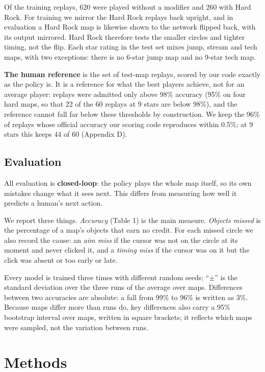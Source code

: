 \documentclass[10pt,a4paper]{article}
\begin{document}
Of the training replays, 620 were played without a modifier and 260 with Hard Rock. For training we mirror the Hard Rock replays back upright, and in evaluation a Hard Rock map is likewise shown to the network flipped back, with its output mirrored. Hard Rock therefore tests the smaller circles and tighter timing, not the flip. Each star rating in the test set mixes jump, stream and tech maps, with two exceptions: there is no 6-star jump map and no 9-star tech map.


\textbf{The human reference} is the set of test-map replays, scored by our code exactly as the policy is. It is a reference for what the best players achieve, not for an average player: replays were admitted only above 98\% accuracy (95\% on four hard maps, so that 22 of the 60 replays at 9 stars are below 98\%), and the reference cannot fall far below these thresholds by construction. We keep the 96\% of replays whose official accuracy our scoring code reproduces within 0.5\%; at 9 stars this keeps 44 of 60 (Appendix D).


\subsection{Evaluation}

All evaluation is \textbf{closed-loop}: the policy plays the whole map itself, so its own mistakes change what it sees next. This differs from measuring how well it predicts a human's next action.


We report three things. \textit{Accuracy} (Table 1) is the main measure. \textit{Objects missed} is the percentage of a map's objects that earn no credit. For each missed circle we also record the cause: an \textit{aim miss} if the cursor was not on the circle at its moment and never clicked it, and a \textit{timing miss} if the cursor was on it but the click was absent or too early or late.


Every model is trained three times with different random seeds; ``$\pm$'' is the standard deviation over the three runs of the average over maps. Differences between two accuracies are absolute: a fall from 99\% to 96\% is written as 3\%. Because maps differ more than runs do, key differences also carry a 95\% bootstrap interval over maps, written in square brackets; it reflects which maps were sampled, not the variation between runs.


\section{Methods}
\end{document}
